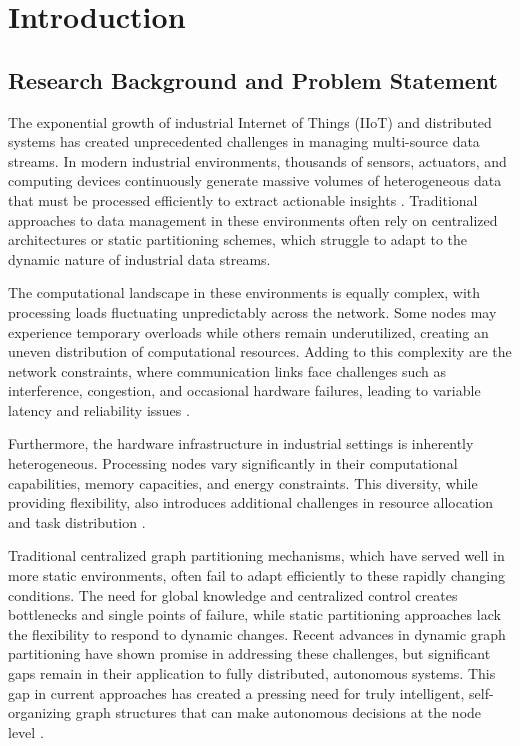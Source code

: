 \chapter{Introduction}

\section{Research Background and Problem Statement}
The exponential growth of industrial Internet of Things (IIoT) and distributed systems has created unprecedented challenges in managing multi-source data streams. In modern industrial environments, thousands of sensors, actuators, and computing devices continuously generate massive volumes of heterogeneous data that must be processed efficiently to extract actionable insights \cite{iot2023}. Traditional approaches to data management in these environments often rely on centralized architectures or static partitioning schemes, which struggle to adapt to the dynamic nature of industrial data streams.

The computational landscape in these environments is equally complex, with processing loads fluctuating unpredictably across the network. Some nodes may experience temporary overloads while others remain underutilized, creating an uneven distribution of computational resources. Adding to this complexity are the network constraints, where communication links face challenges such as interference, congestion, and occasional hardware failures, leading to variable latency and reliability issues \cite{distributed2023}.

Furthermore, the hardware infrastructure in industrial settings is inherently heterogeneous. Processing nodes vary significantly in their computational capabilities, memory capacities, and energy constraints. This diversity, while providing flexibility, also introduces additional challenges in resource allocation and task distribution \cite{technical2023}.

Traditional centralized graph partitioning mechanisms, which have served well in more static environments, often fail to adapt efficiently to these rapidly changing conditions. The need for global knowledge and centralized control creates bottlenecks and single points of failure, while static partitioning approaches lack the flexibility to respond to dynamic changes. Recent advances in dynamic graph partitioning \cite{partitioning2023} have shown promise in addressing these challenges, but significant gaps remain in their application to fully distributed, autonomous systems. This gap in current approaches has created a pressing need for truly intelligent, self-organizing graph structures that can make autonomous decisions at the node level \cite{optimization2023}.

